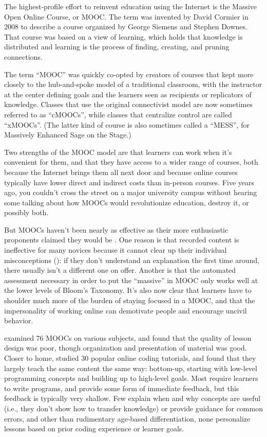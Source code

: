 
The highest-profile effort to reinvent education using the Internet is
the Massive Open Online Course, or MOOC. The term was invented by
David Cormier in 2008 to describe a course organized by George Siemens
and Stephen Downes. That course was based on a
 view of learning, which holds that
knowledge is distributed and learning is the process of finding,
creating, and pruning connections.

The term ``MOOC'' was quickly co-opted by creators of courses that kept
more closely to the hub-and-spoke model of a traditional classroom, with
the instructor at the center defining goals and the learners seen as
recipients or replicators of knowledge. Classes that use the original
connectivist model are now sometimes referred to as ``cMOOCs'', while
classes that centralize control are called ``xMOOCs''. (The latter kind of
course is also sometimes called a ``MESS'', for Massively Enhanced Sage on
the Stage.)

Two strengths of the MOOC model are that learners can work when it's
convenient for them, and that they have access to a wider range of
courses, both because the Internet brings them all next door and because
online courses typically have lower direct and indirect costs than
in-person courses. Five years ago, you couldn't cross the street on a
major university campus without hearing some talking about how MOOCs
would revolutionize education, destroy it, or possibly both.

But MOOCs haven't been nearly as effective as their more enthusiastic
proponents claimed they would be \cite{Ubel2017}. One reason is that
recorded content is ineffective for many novices because it cannot clear
up their individual misconceptions (): if they
don't understand an explanation the first time around, there usually
isn't a different one on offer. Another is that the automated assessment
necessary in order to put the ``massive'' in MOOC only works well at the
lower levels of Bloom's Taxonomy. It's also now clear that learners have
to shoulder much more of the burden of staying focused in a MOOC, and
that the impersonality of working online can demotivate people and
encourage uncivil behavior.

\cite{Marg2015} examined 76 MOOCs on various subjects, and found that
the quality of lesson design was poor, though organization and
presentation of material was good. Closer to home, \cite{Kim2017}
studied 30 popular online coding tutorials, and found that they largely
teach the same content the same way: bottom-up, starting with low-level
programming concepts and building up to high-level goals. Most require
learners to write programs, and provide some form of immediate feedback,
but this feedback is typically very shallow. Few explain when and why
concepts are useful (i.e., they don't show how to transfer knowledge) or
provide guidance for common errors, and other than rudimentary age-based
differentiation, none personalize lessons based on prior coding
experience or learner goals.

